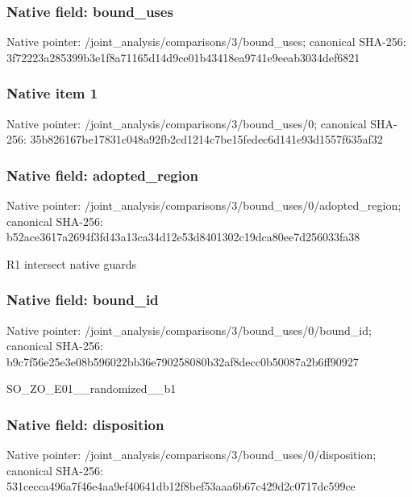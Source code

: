 \documentclass[10pt,a4paper]{article}
\begin{document}
\subsubsection{Native field: bound\_\allowbreak{}uses}
Native pointer: /joint\_\allowbreak{}analysis/comparisons/3/bound\_\allowbreak{}uses; canonical SHA-256: 3f72223a285399b3e1f8a71165d14d9ce01b43418ea9741e9eeab3034def6821

\subsubsection{Native item 1}
Native pointer: /joint\_\allowbreak{}analysis/comparisons/3/bound\_\allowbreak{}uses/0; canonical SHA-256: 35b826167be17831c048a92fb2cd1214c7be15fedec6d141e93d1557f635af32

\subsubsection{Native field: adopted\_\allowbreak{}region}
Native pointer: /joint\_\allowbreak{}analysis/comparisons/3/bound\_\allowbreak{}uses/0/adopted\_\allowbreak{}region; canonical SHA-256: b52ace3617a2694f3fd43a13ca34d12e53d8401302c19dca80ee7d256033fa38

\begingroup\raggedright\sloppy R1 intersect native guards\par\endgroup

\subsubsection{Native field: bound\_\allowbreak{}id}
Native pointer: /joint\_\allowbreak{}analysis/comparisons/3/bound\_\allowbreak{}uses/0/bound\_\allowbreak{}id; canonical SHA-256: b9c7f56e25e3e08b596022bb36e790258080b32af8decc0b50087a2b6ff90927

\begingroup\raggedright\sloppy SO\_\allowbreak{}ZO\_\allowbreak{}E01\_\allowbreak{}\_\allowbreak{}randomized\_\allowbreak{}\_\allowbreak{}b1\par\endgroup

\subsubsection{Native field: disposition}
Native pointer: /joint\_\allowbreak{}analysis/comparisons/3/bound\_\allowbreak{}uses/0/disposition; canonical SHA-256: 531cecca496a7f46e4aa9ef40641db12f8bef53aaa6b67c429d2c0717dc599ce
\end{document}
